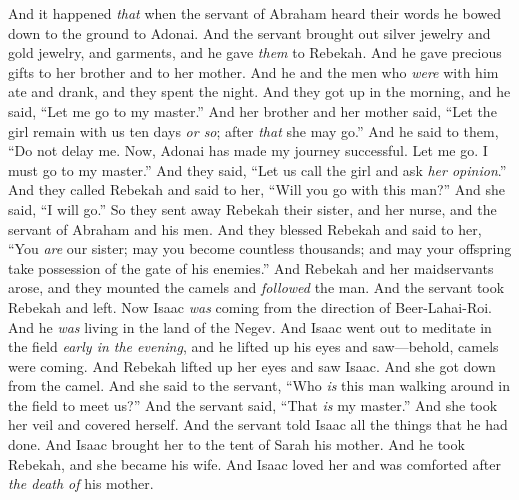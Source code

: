 \begin{biblechapter}
\verse And it happened \textit{that} when the servant of Abraham heard their words he bowed down to the ground to Adonai.
\verse And the servant brought out silver jewelry and gold jewelry, and garments, and he gave \textit{them} to Rebekah. And he gave precious gifts to her brother and to her mother.
\verse And he and the men who \textit{were} with him ate and drank, and they spent the night. And they got up in the morning, and he said, “Let me go to my master.”
\verse And her brother and her mother said, “Let the girl remain with us ten days \textit{or so}; after \textit{that} she may go.”
\verse And he said to them, “Do not delay me. Now, Adonai has made my journey successful. Let me go. I must go to my master.”
\verse And they said, “Let us call the girl and ask \textit{her opinion}.”
\verse And they called Rebekah and said to her, “Will you go with this man?” And she said, “I will go.”
\verse So they sent away Rebekah their sister, and her nurse, and the servant of Abraham and his men.
\verse And they blessed Rebekah and said to her, “You \textit{are} our sister; may you become countless thousands; and may your offspring take possession of the gate of his enemies.”
\verse And Rebekah and her maidservants arose, and they mounted the camels and \textit{followed} the man. And the servant took Rebekah and left.
\verse Now Isaac \textit{was} coming from the direction of Beer-Lahai-Roi. And he \textit{was} living in the land of the Negev.
\verse And Isaac went out to meditate in the field \textit{early in the evening}, and he lifted up his eyes and saw—behold, camels were coming.
\verse And Rebekah lifted up her eyes and saw Isaac. And she got down from the camel.
\verse And she said to the servant, “Who \textit{is} this man walking around in the field to meet us?” And the servant said, “That \textit{is} my master.” And she took her veil and covered herself.
\verse And the servant told Isaac all the things that he had done.
\verse And Isaac brought her to the tent of Sarah his mother. And he took Rebekah, and she became his wife. And Isaac loved her and was comforted after \textit{the death of} his mother.
\end{biblechapter}

